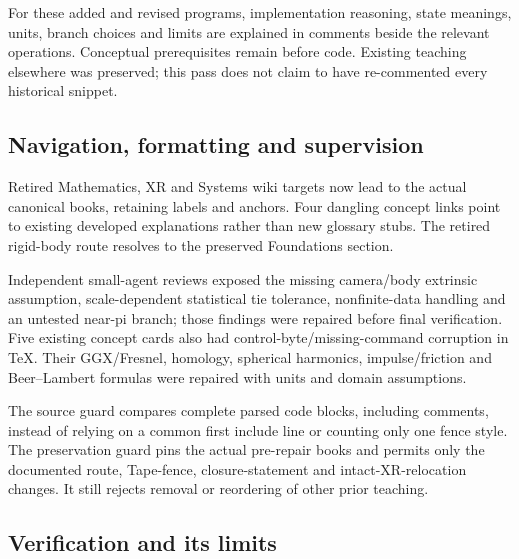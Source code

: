 For these added and revised programs, implementation reasoning, state meanings, units, branch choices and limits are explained in comments beside the relevant operations. Conceptual prerequisites remain before code. Existing teaching elsewhere was preserved; this pass does not claim to have re-commented every historical snippet.

\subsection{Navigation, formatting and supervision}\label{appendix-faa2b5a8e820-navigation-formatting-and-supervision}

Retired Mathematics, XR and Systems wiki targets now lead to the actual canonical books, retaining labels and anchors. Four dangling concept links point to existing developed explanations rather than new glossary stubs. The retired rigid-body route resolves to the preserved Foundations section.

Independent small-agent reviews exposed the missing camera/body extrinsic assumption, scale-dependent statistical tie tolerance, nonfinite-data handling and an untested near-pi branch; those findings were repaired before final verification. Five existing concept cards also had control-byte/missing-command corruption in TeX. Their GGX/Fresnel, homology, spherical harmonics, impulse/friction and Beer--Lambert formulas were repaired with units and domain assumptions.

The source guard compares complete parsed code blocks, including comments, instead of relying on a common first include line or counting only one fence style. The preservation guard pins the actual pre-repair books and permits only the documented route, Tape-fence, closure-statement and intact-XR-relocation changes. It still rejects removal or reordering of other prior teaching.

\subsection{Verification and its limits}\label{appendix-faa2b5a8e820-verification-and-its-limits}

